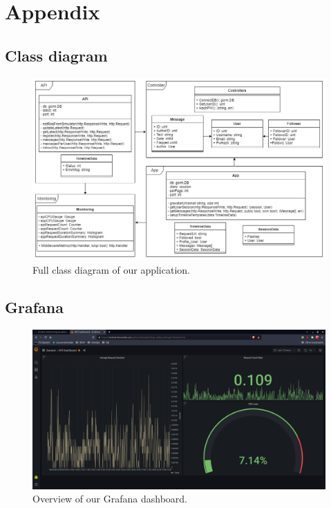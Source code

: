 \appendix

\section{Appendix}


\subsection{Class diagram}

\begin{figure}[H]
    \centering
    \label{appendix:CCDiagram}
    \includegraphics[scale=0.43]{images/full_class_overview.png}
    \caption{Full class diagram of our application.}
\end{figure}

\subsection{Grafana}

\begin{figure}[H]
    \centering
    \label{appendix:dashboard}
    \includegraphics[scale=0.23]{images/Grafana-dashboard.png}
    \caption{Overview of our Grafana dashboard.}
\end{figure}